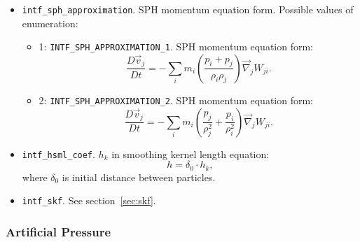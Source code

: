 \begin{itemize}
    \item \verb|intf_sph_approximation|. SPH momentum equation form. Possible values of enumeration:
    \begin{itemize}
        \item 1: \verb|INTF_SPH_APPROXIMATION_1|. SPH momentum equation form:
        \begin{equation}
            \frac{D\vec{v}_j}{D t} = 
            -\sum\limits_{i} m_{i} 
            \left(
            \frac{p_{i} + p_{j}}{\rho_{i} \rho_{j}}
            \right) \vec{\nabla}_{j} W_{ji}.
        \end{equation}
        
        \item 2: \verb|INTF_SPH_APPROXIMATION_2|. SPH momentum equation form:
        \begin{equation}
            \frac{D\vec{v}_j}{D t} = 
            -\sum\limits_{i} m_{i} 
            \left(
            \frac{p_{j}}{\rho_{j}^{2}} + 
            \frac{p_{i}}{\rho_{i}^{2}}
            \right) \vec{\nabla}_{j} W_{ji}.
        \end{equation}
    \end{itemize}

    \item \verb|intf_hsml_coef|. $h_{k}$ in smoothing kernel length equation:
    \begin{equation}
        h = \delta_{0} \cdot h_{k},
    \end{equation}
    where $\delta_{0}$ is initial distance between particles.

    \item \verb|intf_skf|. See section~\ref{sec:skf}.
\end{itemize}

\subsubsection{Artificial Pressure}

